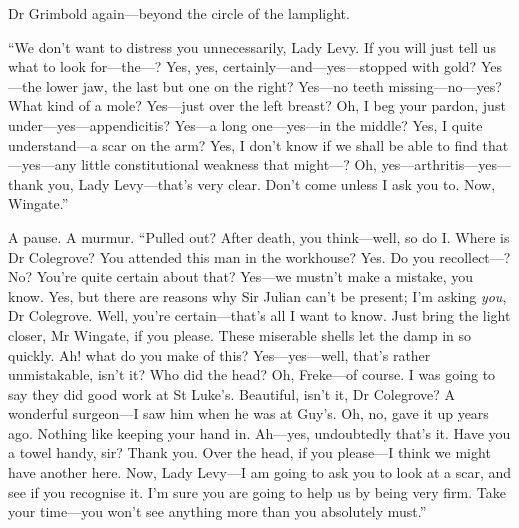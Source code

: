 Dr Grimbold again\allowbreak---\allowbreak beyond the circle of the lamplight.

\enquote{We don’t want to distress you unnecessarily, Lady Levy. If you will just tell us what to look for\allowbreak---\allowbreak the---? Yes, yes, certainly\allowbreak---\allowbreak and---yes\allowbreak---\allowbreak stopped with gold? Yes\allowbreak---\allowbreak the lower jaw, the last but one on the right? Yes\allowbreak---\allowbreak no teeth missing\allowbreak---\allowbreak no---yes? What kind of a mole? Yes\allowbreak---\allowbreak just over the left breast? Oh, I beg your pardon, just under\allowbreak---\allowbreak yes---ap\-pen\-dici\-tis? Yes\allowbreak---\allowbreak a long one\allowbreak---\allowbreak yes---in the middle? Yes, I quite understand\allowbreak---\allowbreak a scar on the arm? Yes, I don’t know if we shall be able to find that\allowbreak---\allowbreak yes---any little constitutional weakness that might---? Oh, yes\allowbreak---\allowbreak arthritis---yes\allowbreak---\allowbreak thank you, Lady Levy\allowbreak---\allowbreak that’s very clear. Don’t come unless I ask you to. Now, Wingate.}

A pause. A murmur. \enquote{Pulled out? After death, you think\allowbreak---\allowbreak well, so do I. Where is Dr Colegrove? You attended this man in the workhouse? Yes. Do you recollect---? No? You’re quite certain about that? Yes\allowbreak---\allowbreak we mustn’t make a mistake, you know. Yes, but there are reasons why Sir Julian can’t be present; I’m asking \textit{you}, Dr Colegrove. Well, you’re certain\allowbreak---\allowbreak that’s all I want to know. Just bring the light closer, Mr Wingate, if you please. These miserable shells let the damp in so quickly. Ah! what do you make of this? Yes\allowbreak---\allowbreak yes---well, that’s rather unmistakable, isn’t it? Who did the head? Oh, Freke\allowbreak---\allowbreak of course. I was going to say they did good work at St Luke’s. Beautiful, isn’t it, Dr Colegrove? A wonderful surgeon\allowbreak---\allowbreak I saw him when he was at Guy’s. Oh, no, gave it up years ago. Nothing like keeping your hand in. Ah\allowbreak---\allowbreak yes, undoubtedly that’s it. Have you a towel handy, sir? Thank you. Over the head, if you please\allowbreak---\allowbreak I think we might have another here. Now, Lady Levy\allowbreak---\allowbreak I am going to ask you to look at a scar, and see if you recognise it. I’m sure you are going to help us by being very firm. Take your time\allowbreak---\allowbreak you won’t see anything more than you absolutely must.}

